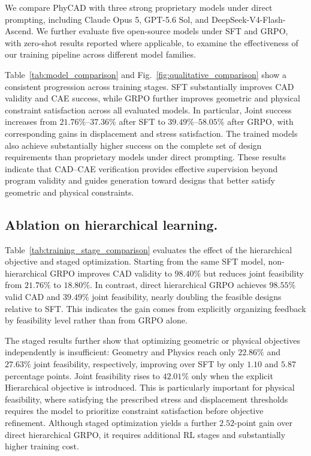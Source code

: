 We compare PhyCAD with three strong proprietary models under direct prompting,
including Claude Opus 5, GPT-5.6 Sol, and DeepSeek-V4-Flash-Ascend.
We further evaluate five open-source models under SFT and GRPO, with zero-shot
results reported where applicable, to examine the effectiveness of our training
pipeline across different model families.

Table~\ref{tab:model_comparison} and Fig.~\ref{fig:qualitative_comparison}
show a consistent progression across training stages.
SFT substantially improves CAD validity and CAE success, while GRPO further
improves geometric and physical constraint satisfaction across all evaluated
models. In particular, Joint success increases from
\(21.76\%\)--\(37.36\%\) after SFT to \(39.49\%\)--\(58.05\%\) after GRPO,
with corresponding gains in displacement and stress satisfaction.
The trained models also achieve substantially higher success on the complete
set of design requirements than proprietary models under direct prompting.
These results indicate that CAD--CAE verification provides effective supervision
beyond program validity and guides generation toward designs that better satisfy geometric and physical constraints.



\subsection{Ablation on hierarchical learning.}
Table~\ref{tab:training_stage_comparison} evaluates the effect of the hierarchical objective and staged optimization. Starting from the same SFT model, non-hierarchical GRPO improves CAD validity to $98.40\%$ but reduces joint feasibility from $21.76\%$ to $18.80\%$. In contrast, direct hierarchical GRPO achieves $98.55\%$ valid CAD and $39.49\%$ joint feasibility, nearly doubling the feasible designs relative to SFT. This indicates the gain comes from explicitly organizing feedback by feasibility level rather than from GRPO alone.

The staged results further show that optimizing geometric or physical objectives independently is insufficient: Geometry and Physics reach only $22.86\%$ and $27.63\%$ joint feasibility, respectively, improving over SFT by only $1.10$ and $5.87$ percentage points. Joint feasibility rises to $42.01\%$ only when the explicit Hierarchical objective is introduced. This is particularly important for physical feasibility, where satisfying the prescribed stress and displacement thresholds requires the model to prioritize constraint satisfaction before objective refinement. Although staged optimization yields a further $2.52$-point gain over direct hierarchical GRPO, it requires additional RL stages and substantially higher training cost.

